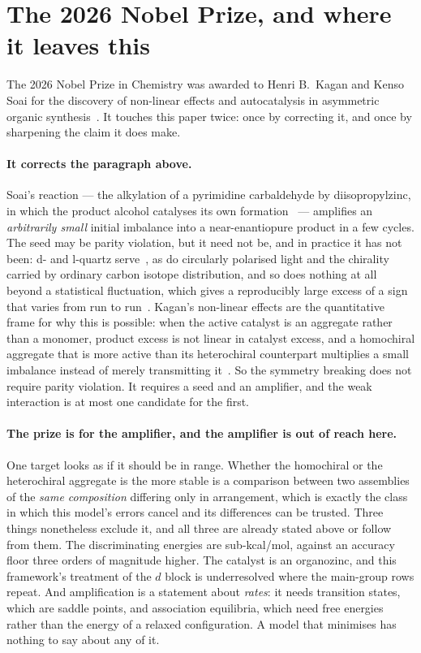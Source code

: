 \documentclass[11pt]{article}
\begin{document}
\section{The 2026 Nobel Prize, and where it leaves this}\label{sec:nobel}

The 2026 Nobel Prize in Chemistry was awarded to Henri B.~Kagan and Kenso Soai for the discovery of
non-linear effects and autocatalysis in asymmetric organic synthesis~\cite{Nobel2026}. It touches
this paper twice: once by correcting it, and once by sharpening the claim it does make.

\paragraph{It corrects the paragraph above.} Soai's reaction --- the alkylation of a pyrimidine
carbaldehyde by diisopropylzinc, in which the product alcohol catalyses its own
formation~\cite{Soai1995} --- amplifies an \emph{arbitrarily small} initial imbalance into a
near-enantiopure product in a few cycles. The seed may be parity violation, but it need not be, and
in practice it has not been: d- and l-quartz serve~\cite{Soai1999}, as do circularly polarised
light and the chirality carried by ordinary carbon isotope distribution, and so does nothing at all
beyond a statistical fluctuation, which gives a reproducibly large excess of a sign that varies from
run to run~\cite{Singleton2002}. Kagan's non-linear effects are the quantitative frame for why this
is possible: when the active catalyst is an aggregate rather than a monomer, product excess is not
linear in catalyst excess, and a homochiral aggregate that is more active than its heterochiral
counterpart multiplies a small imbalance instead of merely transmitting
it~\cite{Puchot1986,Guillaneux1994}. So the symmetry breaking does not require parity violation. It
requires a seed and an amplifier, and the weak interaction is at most one candidate for the first.

\paragraph{The prize is for the amplifier, and the amplifier is out of reach here.} One target looks
as if it should be in range. Whether the homochiral or the heterochiral aggregate is the more stable
is a comparison between two assemblies of the \emph{same composition} differing only in arrangement,
which is exactly the class in which this model's errors cancel and its differences can be trusted.
Three things nonetheless exclude it, and all three are already stated above or follow from them. The
discriminating energies are sub-kcal/mol, against an accuracy floor three orders of magnitude
higher. The catalyst is an organozinc, and this framework's treatment of the $d$ block is
underresolved where the main-group rows repeat. And amplification is a statement about \emph{rates}:
it needs transition states, which are saddle points, and association equilibria, which need free
energies rather than the energy of a relaxed configuration. A model that minimises has nothing to
say about any of it.
\end{document}

